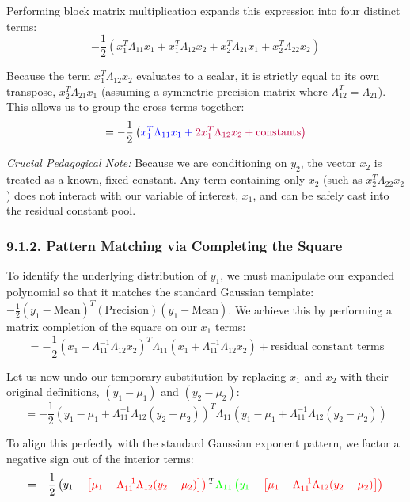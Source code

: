 \documentclass{article}
\begin{document}
Performing block matrix multiplication expands this expression into four distinct terms:
\[ -\frac{1}{2} \left( x_1^T \Lambda_{11} x_1 + x_1^T \Lambda_{12} x_2 + x_2^T \Lambda_{21} x_1 + x_2^T \Lambda_{22} x_2 \right) \]

Because the term $x_1^T \Lambda_{12} x_2$ evaluates to a scalar, it is strictly equal to its own transpose, $x_2^T \Lambda_{21} x_1$ (assuming a symmetric precision matrix where $\Lambda_{12}^T = \Lambda_{21}$). This allows us to group the cross-terms together:
\[ = -\frac{1}{2} \left( \color{blue}{x_1^T \Lambda_{11} x_1} + \color{purple}{2 x_1^T \Lambda_{12} x_2} + \text{constants} \right) \]

\textit{Crucial Pedagogical Note:} Because we are conditioning on $y_2$, the vector $x_2$ is treated as a known, fixed constant. Any term containing only $x_2$ (such as $x_2^T \Lambda_{22} x_2$) does not interact with our variable of interest, $x_1$, and can be safely cast into the residual constant pool.

\subsubsection*{9.1.2. Pattern Matching via Completing the Square}

To identify the underlying distribution of $y_1$, we must manipulate our expanded polynomial so that it matches the standard Gaussian template: $-\frac{1}{2}(y_1 - \text{Mean})^T(\text{Precision})(y_1 - \text{Mean})$. We achieve this by performing a matrix completion of the square on our $x_1$ terms:
\[ = -\frac{1}{2} \left( x_1 + \Lambda_{11}^{-1} \Lambda_{12} x_2 \right)^T \Lambda_{11} \left( x_1 + \Lambda_{11}^{-1} \Lambda_{12} x_2 \right) + \text{residual constant terms} \]

Let us now undo our temporary substitution by replacing $x_1$ and $x_2$ with their original definitions, $(y_1 - \mu_1)$ and $(y_2 - \mu_2)$:
\[ = -\frac{1}{2} \left( y_1 - \mu_1 + \Lambda_{11}^{-1} \Lambda_{12} (y_2 - \mu_2) \right)^T \Lambda_{11} \left( y_1 - \mu_1 + \Lambda_{11}^{-1} \Lambda_{12} (y_2 - \mu_2) \right) \]

To align this perfectly with the standard Gaussian exponent pattern, we factor a negative sign out of the interior terms:
\[ = -\frac{1}{2} \left( y_1 - \color{red}{\left[\mu_1 - \Lambda_{11}^{-1} \Lambda_{12} (y_2 - \mu_2)\right]} \right)^T \color{green}{\Lambda_{11}} \left( y_1 - \color{red}{\left[\mu_1 - \Lambda_{11}^{-1} \Lambda_{12} (y_2 - \mu_2)\right]} \right) \]
\end{document}
